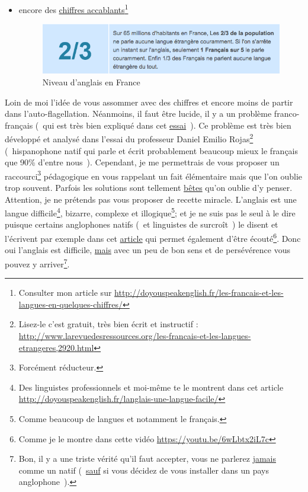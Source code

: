 \begin{itemize}
\begin{figure}[h]
    \label{fig:2}
  \end{figure}
\item encore des
  \href{http://doyouspeakenglish.fr/les-francais-et-les-langues-en-quelques-chiffres/}{chiffres
    accablants}\footnote{Consulter mon article sur \url{http://doyouspeakenglish.fr/les-francais-et-les-langues-en-quelques-chiffres/}}
   
  \begin{figure}[h]
    \centering
    \caption[L'anglais en France]{Niveau d'anglais en France}\vspace{.1cm}
    \includegraphics[scale=.725]{../img/french-english-level-in-france}
    
    \label{fig:3}
  \end{figure}
\end{itemize}
Loin de moi l'idée de vous assommer avec des chiffres et encore moins
de partir dans l'auto-flagellation. Néanmoins, il faut être lucide, il
y a un problème franco-français (~qui est très bien expliqué dans cet
\href{http://www.larevuedesressources.org/les-francais-et-les-langues-etrangeres,2920.html}{essai}~). 
Ce problème est très bien développé et analysé dans l'essai du
professeur Daniel Emilio Rojas\footnote{Lisez-le c'est gratuit, très
  bien écrit et instructif : \url{http://www.larevuedesressources.org/les-francais-et-les-langues-etrangeres,2920.html}} (~hispanophone natif qui parle et écrit
probablement beaucoup mieux le français que 90\% d'entre
nous~). Cependant, je me permettrais de vous proposer un raccourci\footnote{Forcément réducteur.} pédagogique en vous rappelant un fait
élémentaire mais que l'on oublie trop souvent. Parfois les solutions
sont tellement \underline{bêtes} qu'on oublie d'y penser. Attention, je ne
prétends pas vous proposer de recette miracle. L'anglais est une
langue difficile\footnote{Des linguistes professionnels et moi-même te
  le montrent dans cet article \url{http://doyouspeakenglish.fr/langlais-une-langue-facile/} }, bizarre, complexe et
illogique\footnote{Comme beaucoup de langues et notamment le
  français.}; et je ne suis pas le seul à le dire puisque certains anglophones natifs (~et
linguistes de surcroît~) le disent et l'écrivent par exemple dans cet \href{http://doyouspeakenglish.fr/langlais-une-langue-facile/}{article} qui permet également d'être
écouté\footnote{Comme je le montre dans cette vidéo
  \url{https://youtu.be/6wLbtx2iL7c}}. Donc oui l'anglais est
difficile, \underline{mais} avec un peu de bon sens et de persévérence
vous pouvez y arriver\footnote{Bon, il y a une triste vérité qu'il
  faut accepter, vous ne parlerez \underline{jamais} comme un natif (~\underline{sauf}
  si vous décidez de vous installer dans un pays anglophone~).}. 

